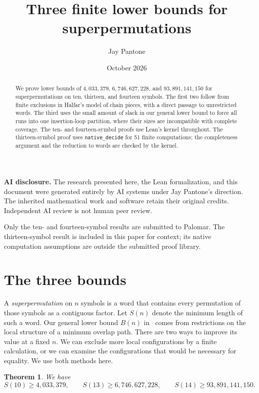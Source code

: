 \documentclass[11pt]{article}
\title{Three finite lower bounds for superpermutations}
\author{Jay Pantone}
\date{October 2026}
\newtheorem{theorem}{Theorem}[section]
\begin{document}
\maketitle
\begin{abstract}
We prove lower bounds of $4{,}033{,}379$, $6{,}746{,}627{,}228$, and
$93{,}891{,}141{,}150$ for superpermutations on ten, thirteen, and fourteen
symbols. The first two follow from finite exclusions in Halfar's model
of chain pieces, with a direct passage to unrestricted words. The third
uses the small amount of slack in our general lower bound to force all
runs into one insertion-loop partition, where their sizes are incompatible
with complete coverage. The ten- and fourteen-symbol proofs use Lean's
kernel throughout. The thirteen-symbol proof uses \nolinkurl{native_decide}
for 51 finite computations; the completeness argument and the reduction
to words are checked by the kernel.
\end{abstract}

\noindent\textbf{AI disclosure.} The research presented here, the Lean
formalization, and this document were generated entirely by AI systems
under Jay Pantone's direction. The inherited mathematical work and
software retain their original credits. Independent AI review is not
human peer review.

Only the ten- and fourteen-symbol results are submitted to Palomar. The
thirteen-symbol result is included in this paper for context; its native
computation assumptions are outside the submitted proof library.

\section{The three bounds}
A \emph{superpermutation} on $n$ symbols is a word that contains every
permutation of those symbols as a contiguous factor. Let $S(n)$ denote
the minimum length of such a word. Our general lower bound
$B(n)$ in~\cite{returns} comes from restrictions on the local structure
of a minimum overlap path. There are two ways to improve its value at
a fixed $n$. We can exclude more local configurations by a finite
calculation, or we can examine the configurations that would be necessary
for equality. We use both methods here.

\begin{theorem}\label{thm-main}
We have
\[
 S(10)\ge4{,}033{,}379,\qquad
 S(13)\ge6{,}746{,}627{,}228,\qquad
 S(14)\ge93{,}891{,}141{,}150.
\]
\end{theorem}
\end{document}

